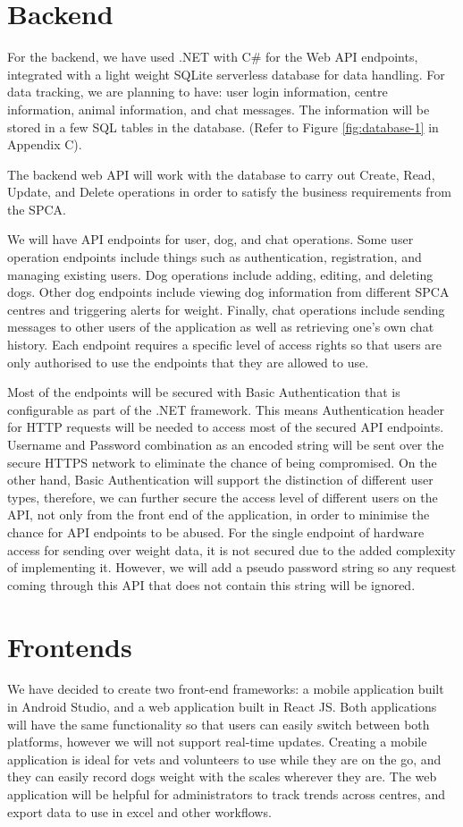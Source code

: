 \section{Backend}

For the backend, we have used .NET with C\# for the Web API endpoints, integrated with a light weight SQLite serverless database for data handling. For data tracking, we are planning to have: user login information, centre information, animal information, and chat messages. The information will be stored in a few SQL tables in the database. (Refer to Figure \ref{fig:database-1} in Appendix C).

The backend web API will work with the database to carry out Create, Read, Update, and Delete operations in order to satisfy the business requirements from the SPCA.

We will have API endpoints for user, dog, and chat operations. Some user operation endpoints include things such as authentication, registration, and managing existing users. Dog operations include adding, editing, and deleting dogs. Other dog endpoints include viewing dog information from different SPCA centres and triggering alerts for weight. Finally, chat operations include sending messages to other users of the application as well as retrieving one’s own chat history. Each endpoint requires a specific level of access rights so that users are only authorised to use the endpoints that they are allowed to use.

Most of the endpoints will be secured with Basic Authentication that is configurable as part of the .NET framework. This means Authentication header for HTTP requests will be needed to access most of the secured API endpoints. Username and Password combination as an encoded string will be sent over the secure HTTPS network to eliminate the chance of being compromised. On the other hand, Basic Authentication will support the distinction of different user types, therefore, we can further secure the access level of different users on the API, not only from the front end of the application, in order to minimise the chance for API endpoints to be abused. For the single endpoint of hardware access for sending over weight data, it is not secured due to the added complexity of implementing it. However, we will add a pseudo password string so any request coming through this API that does not contain this string will be ignored.


\section{Frontends}
We have decided to create two front-end frameworks: a mobile application built in Android Studio, and a web application built in React JS. Both applications will have the same functionality so that users can easily switch between both platforms, however we will not support real-time updates. Creating a mobile application is ideal for vets and volunteers to use while they are on the go, and they can easily record dogs weight with the scales wherever they are. The web application will be helpful for administrators to track trends across centres, and export data to use in excel and other workflows. 

